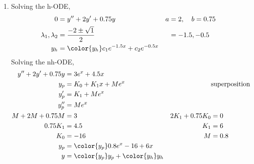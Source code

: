\begin{enumerate}
    \item Solving the h-ODE,
          \begin{align}
              0                        & = y'' + 2y' + 0.75y          &
              a                        & = 2, \quad b = 0.75            \\
              \lambda_{1}, \lambda_{2} & = \frac{-2 \pm \sqrt{1}}{2}  &
                                       & = -1.5, -0.5                   \\
              y_{h}                    & = \color{y_h} c_{1}e^{-1.5x}
              + c_{2}e^{-0.5x}
          \end{align}
          Solving the nh-ODE,
          \begin{align}
              y'' + 2y' + 0.75y  & = 3e^{x} + 4.5x                               \\
              y_{p}              & = K_{0} + K_{1}x + M e^{x}                  &
                                 & \text{superposition}                          \\
              y_{p}'             & = K_{1} + Me^{x}                              \\
              y_{p}''            & = Me^{x}                                      \\
              M + 2M + 0.75M     & = 3                                         &
              2K_{1} + 0.75K_{0} & = 0                                           \\
              0.75K_{1}          & = 4.5                                       &
              K_{1}              & = 6                                           \\
              K_{0}              & = -16                                       &
              M                  & = 0.8                                         \\
              y_{p}              & = \color{y_p} 0.8e^{x} -16 + 6x               \\
              y                  & = {\color{y_p} y_{p}} + {\color{y_h} y_{h}}
          \end{align}


\end{enumerate}
